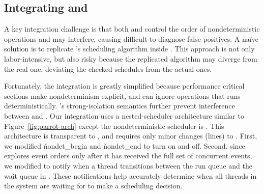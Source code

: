 


\subsection{Integrating \parrot and \dbug} \label{sec:parrot-smt+mc}

A key integration challenge is that both \parrot and \dbug control the order
of nondeterministic operations and may interfere, causing
difficult-to-diagnose false positives.  A na\"{i}ve solution
is to replicate \parrot's scheduling algorithm inside \dbug.  This
approach is not only labor-intensive, but also risky because the
replicated algorithm may diverge from the real one, deviating the checked
schedules from the actual ones.

Fortunately, the integration is greatly simplified because performance
critical sections make nondeterminism explicit, and \dbug can ignore
operations that \parrot runs deterministically.  \parrot's strong-isolation
semantics further prevent interference
between \parrot and \dbug.  Our integration uses a nested-scheduler
architecture similar to Figure~\ref{fig:parrot-arch} except the
nondeterministic scheduler is \dbug.  This architecture is transparent
to \dbug, and requires only minor changes (\locsmcmc lines) to \parrot.
First, we modified \v{nondet\_begin} and \v{nondet\_end} to turn \dbug
on and off.  Second, since \dbug explores event orders only after
it has received the full set of concurrent events, we modified
\parrot to notify \dbug when a thread transitions between the run queue
and the wait queue in \parrot. These notifications help \dbug accurately
determine when all threads in the system are waiting for \dbug to make
a scheduling decision.

